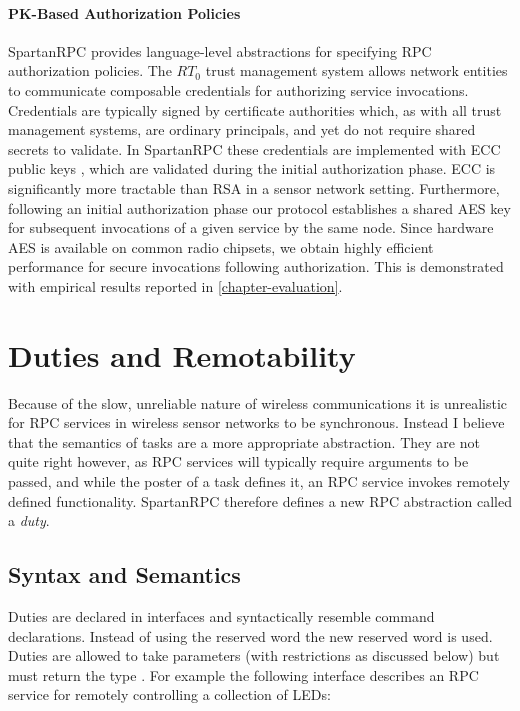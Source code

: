 \paragraph{PK-Based Authorization Policies} SpartanRPC provides language-level abstractions for
specifying RPC authorization policies. The $RT_0$ trust management system allows network
entities to communicate composable credentials for authorizing service invocations. Credentials
are typically signed by certificate authorities which, as with all trust management systems, are
ordinary principals, and yet do not require shared secrets to validate. In SpartanRPC these
credentials are implemented with ECC public keys \cite{bertoni-2006}, which are validated during
the initial authorization phase. ECC is significantly more tractable than RSA in a sensor
network setting. Furthermore, following an initial authorization phase our protocol establishes
a shared AES key for subsequent invocations of a given service by the same node. Since hardware
AES is available on common radio chipsets, we obtain highly efficient performance for secure
invocations following authorization. This is demonstrated with empirical results reported in
\autoref{chapter-evaluation}.

\section{Duties and Remotability}
\label{section-duties}

Because of the slow, unreliable nature of wireless communications it is unrealistic for RPC
services in wireless sensor networks to be synchronous. Instead I believe that the semantics of
tasks are a more appropriate abstraction. They are not quite right however, as RPC services will
typically require arguments to be passed, and while the poster of a task defines it, an RPC
service invokes remotely defined functionality. SpartanRPC therefore defines a new RPC
abstraction called a \emph{duty}.

\subsection{Syntax and Semantics}
\label{section-duties-syntax}

Duties are declared in interfaces and syntactically resemble command declarations. Instead of
using the reserved word  the new reserved word  is used. Duties are
allowed to take parameters (with restrictions as discussed below) but must return the type
. For example the following interface describes an RPC service for remotely
controlling a collection of LEDs:

